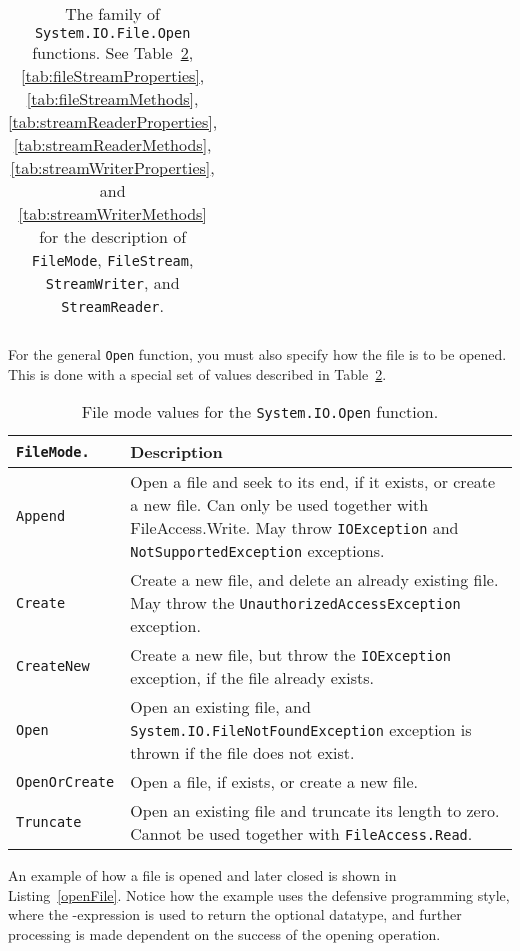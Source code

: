 \begin{table}
\begin{center}
\begin{tabularx}{\linewidth}{|>{\hsize=.45\hsize\raggedright\arraybackslash}X|>{\hsize=.55\hsize\raggedright\arraybackslash}X|}
      \hline
    \end{tabularx}
  \end{center}
  \caption{The family of \lstinline!System.IO.File.Open! functions. See Table~\ref{tab:filemode}, \ref{tab:fileStreamProperties}, \ref{tab:fileStreamMethods}, \ref{tab:streamReaderProperties}, \ref{tab:streamReaderMethods}, \ref{tab:streamWriterProperties}, and \ref{tab:streamWriterMethods} for the description of \lstinline{FileMode}, \lstinline{FileStream}, \lstinline{StreamWriter}, and \lstinline{StreamReader}.}
  \label{tab:File.Open}
\end{table}
For the general \lstinline!Open! function, you must also specify how the file is to be opened. This is done with a special set of values described in Table~\ref{tab:filemode}. 
\begin{table}
  \centering
  \begin{tabularx}{\linewidth}{|l|X|}
    \hline
    \rowcolor{headerRowColor} \lstinline{FileMode.} & Description\\
    \hline
    \lstinline{Append} & Open a file and seek to its end, if it exists, or create a new file. Can only be used together with FileAccess.Write. May throw \mbox{\lstinline{IOException}} and \mbox{\lstinline{NotSupportedException}} exceptions.\\
    \hline
    \lstinline{Create} & Create a new file, and delete an already existing file. May throw the \mbox{\lstinline{UnauthorizedAccessException}} exception.\\
    \hline
    \lstinline{CreateNew} & Create a new file, but throw the \mbox{\lstinline{IOException}} exception, if the file already exists.\\
    \hline
    \lstinline{Open} & Open an existing file, and \mbox{\lstinline{System.IO.FileNotFoundException}} exception is thrown if the file does not exist.\\
    \hline
    \lstinline{OpenOrCreate} & Open a file, if exists, or create a new file.\\
    \hline
    \lstinline{Truncate} & Open an existing file and truncate its length to zero. Cannot be used together with \mbox{\lstinline{FileAccess.Read}}.\\
    \hline
  \end{tabularx}
  \caption{File mode values for the \lstinline!System.IO.Open! function.}
  \label{tab:filemode}
\end{table}
An example of how a file is opened and later closed is shown in Listing~\ref{openFile}.
%
%
Notice how the example uses the defensive programming style, where the -expression is used to return the optional datatype, and further processing is made dependent on the success of the opening operation.

